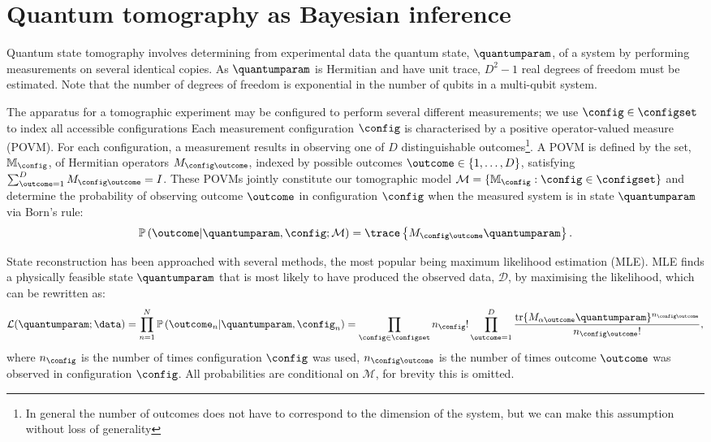 \section{Quantum tomography as Bayesian inference}

Quantum state tomography involves determining from experimental data the quantum state, $\quantumparam$, of a system by performing measurements on several identical copies. As $\quantumparam$ is Hermitian and have unit trace, $D^2-1$ real degrees of freedom must be estimated. Note that the number of degrees of freedom is exponential in the number of qubits in a multi-qubit system.

The apparatus for a tomographic experiment may be configured to perform several different measurements; we use $\config\in\configset$ to index all accessible configurations Each measurement configuration $\config$ is characterised by a positive operator-valued measure (POVM). For each configuration, a measurement results in observing one of $D$ distinguishable outcomes\footnote{In general the number of outcomes does not have to correspond to the dimension of the system, but we can make this assumption without loss of generality }. A POVM is defined by the set, $\mathbb{M}_{\config}$, of Hermitian operators $M_{\config\outcome}$, indexed by possible outcomes $\outcome\in\{1,\ldots,D\}$, satisfying $\sum_{\outcome=1}^{D} M_{\config\outcome} = I$. These POVMs jointly constitute our tomographic model $\mathcal{M}=\{\mathbb{M}_{\config}:\config\in\configset\}$ and determine the probability of observing outcome $\outcome$ in configuration $\config$ when the measured system is in state $\quantumparam$ via Born's rule:
%
\begin{equation}
	\mathbb{P}\left(\outcome\vert\quantumparam,\config;\mathcal{M}\right) = \trace\left\{M_{\config\outcome}\quantumparam \right\}.\label{eqn:quantum_Born}
\end{equation}

State reconstruction has been approached with several methods, the most popular being maximum likelihood estimation (MLE). MLE finds a physically feasible state $\quantumparam$ that is most likely to have produced the observed data, $\mathcal{D}$, by maximising the likelihood, which can be rewritten as:
%
\begin{equation}
	\label{eqn:quantum_lik}
	\mathcal{L}(\quantumparam;\data)=\prod_{n=1}^{N} \mathbb{P}\left(\outcome_n\vert\quantumparam,\config_n\right) = \prod_{\config \in \configset}n_{\config}!\prod_{\outcome=1}^{D}\frac{\mbox{tr}\{M_{\alpha\outcome}\quantumparam\}^{n_{\config\outcome}}}{n_{\config\outcome}!},
\end{equation}
%
where $n_{\config}$ is the number of times configuration $\config$ was used, $n_{\config\outcome}$ is the number of times outcome $\outcome$ was observed in configuration $\config$. All probabilities are conditional on $\mathcal{M}$, for brevity this is omitted.

